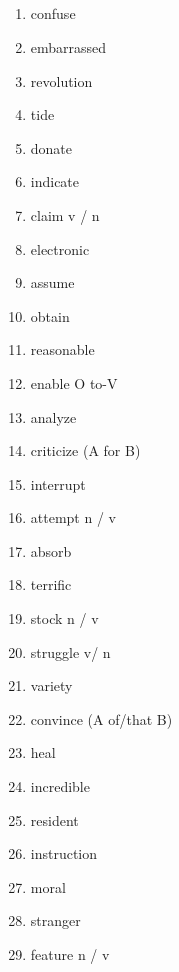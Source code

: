 \documentclass[10pt, a4paper, landscape]{oblivoir}
\begin{document}
\begin{multicols}{3}
    \section{}
    \begin{enumerate}
        \item confuse
        \item embarrassed 
        \item revolution 
        \item tide 
        \item donate 
        \item indicate 
        \item claim v / n
        \item electronic
        \item assume 
        \item obtain 
        \item reasonable 
        \item enable O to-V
        \item analyze 
        \item criticize (A for B)
        \item interrupt 
        \item attempt n / v
        \item absorb 
        \item terrific 
        \item stock n / v
       \item struggle v/ n
        \item variety 
        \item convince (A of/that B)
        \item heal 
        \item incredible 
        \item resident 
        \item instruction 
        \item moral 
        \item stranger 
        \item feature n / v

    \end{enumerate}

\end{multicols}
\end{document}
